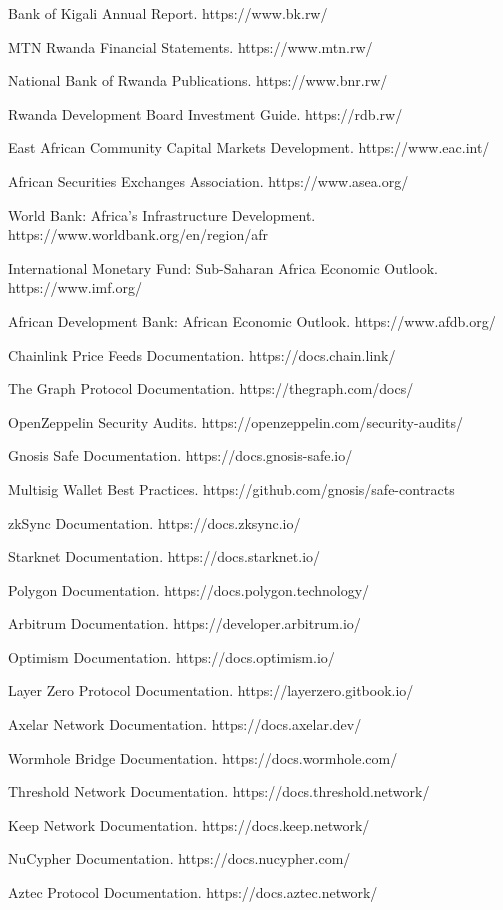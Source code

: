 \documentclass[12pt]{article}
\begin{document}
Bank of Kigali Annual Report. https://www.bk.rw/

MTN Rwanda Financial Statements. https://www.mtn.rw/

National Bank of Rwanda Publications. https://www.bnr.rw/

Rwanda Development Board Investment Guide. https://rdb.rw/

East African Community Capital Markets Development. https://www.eac.int/

African Securities Exchanges Association. https://www.asea.org/

World Bank: Africa's Infrastructure Development. https://www.worldbank.org/en/region/afr

International Monetary Fund: Sub-Saharan Africa Economic Outlook. https://www.imf.org/

African Development Bank: African Economic Outlook. https://www.afdb.org/

Chainlink Price Feeds Documentation. https://docs.chain.link/

The Graph Protocol Documentation. https://thegraph.com/docs/

OpenZeppelin Security Audits. https://openzeppelin.com/security-audits/

Gnosis Safe Documentation. https://docs.gnosis-safe.io/

Multisig Wallet Best Practices. https://github.com/gnosis/safe-contracts

zkSync Documentation. https://docs.zksync.io/

Starknet Documentation. https://docs.starknet.io/

Polygon Documentation. https://docs.polygon.technology/

Arbitrum Documentation. https://developer.arbitrum.io/

Optimism Documentation. https://docs.optimism.io/

Layer Zero Protocol Documentation. https://layerzero.gitbook.io/

Axelar Network Documentation. https://docs.axelar.dev/

Wormhole Bridge Documentation. https://docs.wormhole.com/

Threshold Network Documentation. https://docs.threshold.network/

Keep Network Documentation. https://docs.keep.network/

NuCypher Documentation. https://docs.nucypher.com/

Aztec Protocol Documentation. https://docs.aztec.network/
\end{document}
